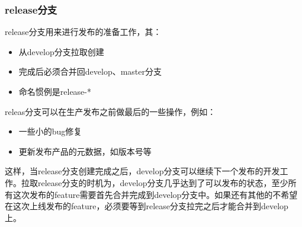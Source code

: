 \documentclass[12pt]{article}
\begin{document}
\subsubsection{release分支}\label{releaseux5206ux652f}

release分支用来进行发布的准备工作，其：

\begin{itemize}
\tightlist
\item
  从develop分支拉取创建
\item
  完成后必须合并回develop、master分支
\item
  命名惯例是release-*
\end{itemize}

releas分支可以在生产发布之前做最后的一些操作，例如：

\begin{itemize}
\tightlist
\item
  一些小的bug修复
\item
  更新发布产品的元数据，如版本号等
\end{itemize}

这样，当release分支创建完成之后，develop分支可以继续下一个发布的开发工作。拉取release分支的时机为，develop分支几乎达到了可以发布的状态，至少所有这次发布的feature需要首先合并完成到develop分支中。如果还有其他的不希望在这次上线发布的feature，必须要等到release分支拉完之后才能合并到develop上。

\begin{Shaded}
\begin{Highlighting}[]

  
\end{Highlighting}
\end{Shaded}

\begin{Shaded}
\begin{Highlighting}[]


\end{Highlighting}
\end{Shaded}
\end{document}
